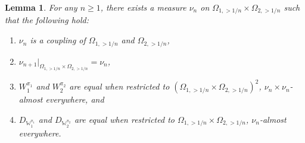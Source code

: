 \documentclass{amsart}
\numberwithin{equation}{section}
\numberwithin{figure}{section}
\newtheorem{lemma}[theorem]{Lemma}
\theoremstyle{definition}
\theoremstyle{remark}
\newcommand{\cW}{\mathbb{W}}
\begin{document}
\begin{lemma} \label{lemmarestricted}
For any $n \ge 1$, there exists a measure $\nu_n$ on $\Omega_{1,>1/n} \times
\Omega_{2,>1/n}$ such that the following hold:
\begin{enumerate}
\item $\nu_n$ is a coupling of $\Omega_{1,>1/n}$ and $\Omega_{2,>1/n}$,
    \label{restrictedcoupling}
\item ${\nu_{n+1}}|_{\Omega_{1,>1/n} \times \Omega_{2,>1/n}}=\nu_{n}$,
    \label{restrictedmeasuresequal}
\item $W_1^{\pi_1}$ and $W_2^{\pi_2}$ are equal when restricted to
    $(\Omega_{1,>1/n} \times \Omega_{2,>1/n})^2$, $\nu_n\times\nu_n$-almost
everywhere, and   \label{restrictedgraphonequal}
\item $D_{\cW_1^{\pi_1}}$ and $D_{\cW_2^{\pi_2}}$ are equal when restricted
    to $\Omega_{1,>1/n} \times \Omega_{2,>1/n}$, $\nu_n$-almost everywhere.
\label{restrictedstarequal}
\end{enumerate}
\end{lemma}
\end{document}

